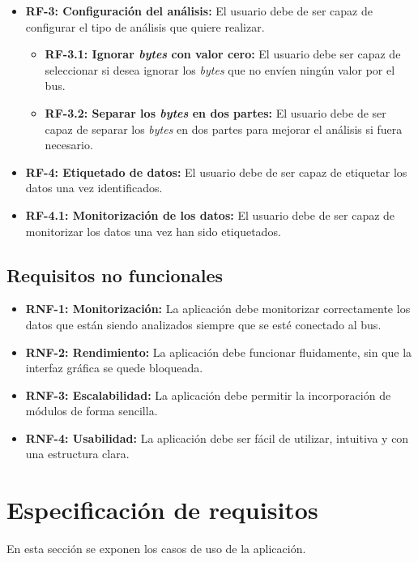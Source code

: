 \begin{itemize}
\item
\textbf{RF-3: Configuración del análisis:} El usuario debe de ser capaz de configurar el tipo de análisis que quiere realizar.
\begin{itemize}
\item
\textbf{RF-3.1: Ignorar \emph{bytes} con valor cero:} El usuario debe ser capaz de seleccionar si desea ignorar los \emph{bytes} que no envíen ningún valor por el bus.
\item
\textbf{RF-3.2: Separar los \emph{bytes} en dos partes:} El usuario debe de ser capaz de separar los \emph{bytes} en dos partes para mejorar el análisis si fuera necesario.
\end{itemize}
\item
\textbf{RF-4: Etiquetado de datos:} El usuario debe de ser capaz de etiquetar los datos una vez identificados.
\item
\begin{itemize}
\textbf{RF-4.1: Monitorización de los datos:} El usuario debe de ser capaz de monitorizar los datos una vez han sido etiquetados.
\end{itemize}
\end{itemize}


\subsection{Requisitos no funcionales}

\begin{itemize}
\item
\textbf{RNF-1: Monitorización:} La aplicación debe monitorizar correctamente los datos que están siendo analizados siempre que se esté conectado al bus.
\item
\textbf{RNF-2: Rendimiento:} La aplicación debe funcionar fluidamente, sin que la interfaz gráfica se quede bloqueada.
\item
\textbf{RNF-3: Escalabilidad:} La aplicación debe permitir la incorporación de módulos de forma sencilla.
\item
\textbf{RNF-4: Usabilidad:} La aplicación debe ser fácil de utilizar, intuitiva y con una estructura clara.
\end{itemize}
\newpage
\section{Especificación de requisitos}

En esta sección se exponen los casos de uso de la aplicación.


